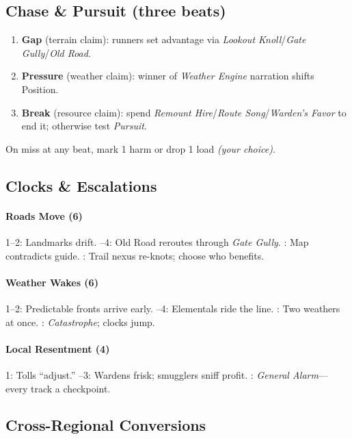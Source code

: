 \subsection*{Chase \& Pursuit (three beats)}

\begin{enumerate}
\item \textbf{Gap} (terrain claim): runners set advantage via \emph{Lookout Knoll}/\emph{Gate Gully}/\emph{Old Road}.  
\item \textbf{Pressure} (weather claim): winner of \emph{Weather Engine} narration shifts Position.  
\item \textbf{Break} (resource claim): spend \emph{Remount Hire}/\emph{Route Song}/\emph{Warden’s Favor} to end it; otherwise test \emph{Pursuit}. 
\end{enumerate}
On miss at any beat, mark 1 harm or drop 1 load \emph{(your choice)}.
\subsection*{Clocks \& Escalations}

\paragraph{Roads Move (6)}
1–2: Landmarks drift. –4: Old Road reroutes through \emph{Gate Gully}. : Map contradicts guide. : Trail nexus re-knots; choose who benefits.

\paragraph{Weather Wakes (6)}
1–2: Predictable fronts arrive early. –4: Elementals ride the line. : Two weathers at once. : \emph{Catastrophe}; clocks jump.

\paragraph{Local Resentment (4)}
1: Tolls “adjust.” –3: Wardens frisk; smugglers sniff profit. : \emph{General Alarm}—every track a checkpoint.
\subsection*{Cross-Regional Conversions}

